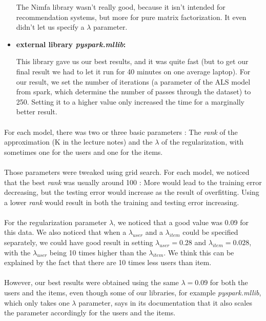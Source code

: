 \documentclass[a4paper]{article}
\begin{document}
\begin{itemize}
The Nimfa library wasn't really good, because it isn't intended for recommendation systems, but more for pure matrix factorization. It even didn't let us specify a \(\lambda\) parameter.
\item \textbf{external library \textit{pyspark.mllib}:}  

This library gave us our best results, and it was quite fast (but to get our final result we had to let it run for 40 minutes on one average laptop).
For our result, we set the number of iterations (a parameter of the ALS model from spark, which determine the number of passes through the dataset) to 250. Setting it to a higher value only increased the time for a marginally better result. 
\end{itemize}

\paragraph{}
For each model, there was two or three basic parameters : The \textit{rank} of the approximation (K in the lecture notes) and the \(\lambda\) of the regularization, with sometimes one for the users and one for the items. 

\paragraph{}
Those parameters were tweaked using grid search. For each model, we noticed that the best \textit{rank} was usually around 100 : 
More would lead to the training error decreasing, but the testing error would increase as the result of overfitting. Using a lower \textit{rank} would result in both the training and testing error increasing.
\paragraph{}
For the regularization parameter \(\lambda\), we noticed that a good value was 0.09 for this data. We also noticed that when a \(\lambda_{user}\) and a \(\lambda_{item}\) could be specified separately, we could have good result in setting \(\lambda_{user} = 0.28\) and \(\lambda_{item} = 0.028\), with the \(\lambda_{user}\) being 10 times higher than the \(\lambda_{item}\). We think this can be explained by the fact that there are 10 times less users than item. 
\paragraph{}
However, our best results were obtained using the same \(\lambda = 0.09\) for both the users and the items, even though some of our libraries, for example \textit{pyspark.mllib}, which only takes one \(\lambda\) parameter, says in its documentation that it also scales the parameter accordingly for the users and the items.
\end{document}
